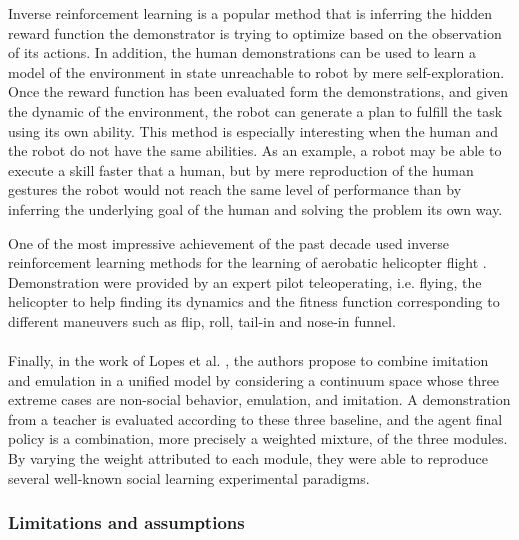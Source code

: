 Inverse reinforcement learning \cite{ng2000algorithms,Abbeel04icml,macl09airl} is a popular method that is inferring the hidden reward function the demonstrator is trying to optimize based on the observation of its actions. In addition, the human demonstrations can be used to learn a model of the environment in state unreachable to robot by mere self-exploration. Once the reward function has been evaluated form the demonstrations, and given the dynamic of the environment, the robot can generate a plan to fulfill the task using its own ability. This method is especially interesting when the human and the robot do not have the same abilities. As an example, a robot may be able to execute a skill faster that a human, but by mere reproduction of the human gestures the robot would not reach the same level of performance than by inferring the underlying goal of the human and solving the problem its own way.

One of the most impressive achievement of the past decade used inverse reinforcement learning methods for the learning of aerobatic helicopter flight \cite{abbeel2007application}. Demonstration were provided by an expert pilot teleoperating, i.e. flying, the helicopter to help finding its dynamics and the fitness function corresponding to different maneuvers such as flip, roll, tail-in and nose-in funnel.


\paragraph{} Finally, in the work of Lopes et al. \cite{lopes2009computational}, the authors propose to combine imitation and emulation in a unified model by considering a continuum space whose three extreme cases are non-social behavior, emulation, and imitation. A demonstration from a teacher is evaluated according to these three baseline, and the agent final policy is a combination, more precisely a weighted mixture, of the three modules. By varying the weight attributed to each module, they were able to reproduce several well-known social learning experimental paradigms.


\subsubsection*{Limitations and assumptions}

